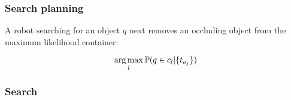 \begin{frame}
  \frametitle{Search planning}
  A robot searching for an object $q$ next removes an occluding object
  from the maximum likelihood container:

  \[\operatorname*{arg\,max}_l{\mathbb{P}(q \in c_l|\{t_{o_j}\})}\]
\end{frame}

\begin{frame}
  \frametitle{Search}
  \begin{center}
  \end{center}
\end{frame}